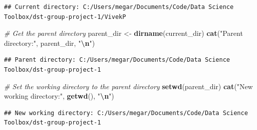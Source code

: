 \documentclass[
]{article}
\newenvironment{Shaded}{\begin{snugshade}}{\end{snugshade}}
\newcommand{\CommentTok}[1]{\textcolor[rgb]{0.56,0.35,0.01}{\textit{#1}}}
\newcommand{\FunctionTok}[1]{\textcolor[rgb]{0.13,0.29,0.53}{\textbf{#1}}}
\newcommand{\NormalTok}[1]{#1}
\newcommand{\OtherTok}[1]{\textcolor[rgb]{0.56,0.35,0.01}{#1}}
\newcommand{\SpecialCharTok}[1]{\textcolor[rgb]{0.81,0.36,0.00}{\textbf{#1}}}
\newcommand{\StringTok}[1]{\textcolor[rgb]{0.31,0.60,0.02}{#1}}
\begin{document}
\begin{verbatim}
## Current directory: C:/Users/megar/Documents/Code/Data Science Toolbox/dst-group-project-1/VivekP
\end{verbatim}

\begin{Shaded}
\begin{Highlighting}[]
\CommentTok{\# Get the parent directory}
\NormalTok{parent\_dir }\OtherTok{\textless{}{-}} \FunctionTok{dirname}\NormalTok{(current\_dir)}
\FunctionTok{cat}\NormalTok{(}\StringTok{"Parent directory:"}\NormalTok{, parent\_dir, }\StringTok{"}\SpecialCharTok{\textbackslash{}n}\StringTok{"}\NormalTok{)}
\end{Highlighting}
\end{Shaded}

\begin{verbatim}
## Parent directory: C:/Users/megar/Documents/Code/Data Science Toolbox/dst-group-project-1
\end{verbatim}

\begin{Shaded}
\begin{Highlighting}[]
\CommentTok{\# Set the working directory to the parent directory}
\FunctionTok{setwd}\NormalTok{(parent\_dir)}
\FunctionTok{cat}\NormalTok{(}\StringTok{"New working directory:"}\NormalTok{, }\FunctionTok{getwd}\NormalTok{(), }\StringTok{"}\SpecialCharTok{\textbackslash{}n}\StringTok{"}\NormalTok{)}
\end{Highlighting}
\end{Shaded}

\begin{verbatim}
## New working directory: C:/Users/megar/Documents/Code/Data Science Toolbox/dst-group-project-1
\end{verbatim}
\end{document}
